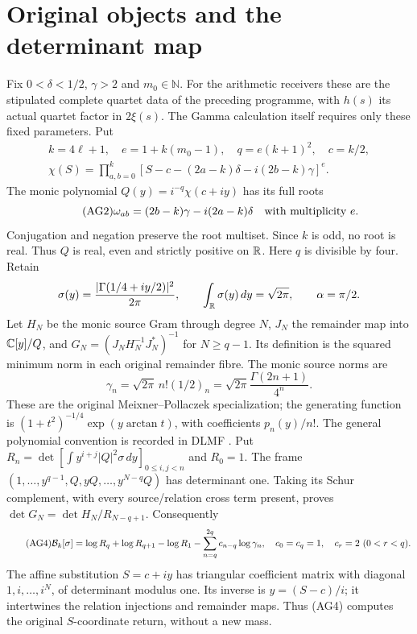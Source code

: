 \documentclass[11pt,a4paper]{article}
\providecommand{\dd}{\,d}
\begin{document}
\section{Original objects and the determinant map}
Fix $0<\delta<1/2$, $\gamma>2$ and $m_0\in\mathbb N$. For the arithmetic
receivers these are the stipulated complete quartet data of the preceding
programme, with $h(s)$ its actual quartet factor in $2\xi(s)$.
The Gamma calculation itself requires only these fixed parameters. Put
\begin{equation}\tag{AG1}
\begin{gathered}
 k=4\ell+1,\quad e=1+k(m_0-1),\quad q=e(k+1)^2,\quad c=k/2,\\
 \chi(S)=\prod_{a,b=0}^k
 [S-c-(2a-k)\delta-i(2b-k)\gamma]^e.
\end{gathered}
\end{equation}
The monic polynomial $Q(y)=i^{-q}\chi(c+iy)$ has its full roots
\begin{equation}\tag{AG2}
 \omega_{ab}=(2b-k)\gamma-i(2a-k)\delta
 \quad\hbox{with multiplicity }e.
\end{equation}
Conjugation and negation preserve the root multiset. Since $k$ is odd,
no root is real. Thus $Q$ is real, even and strictly positive on $\mathbb R$.
Here $q$ is divisible by four. Retain
\[
 \sigma(y)=\frac{|\Gamma(1/4+iy/2)|^2}{2\pi},\qquad
 \int_\R\sigma(y)\dd y=\sqrt{2\pi},\qquad \alpha=\pi/2.
\]
Let $H_N$ be the monic source Gram through degree $N$, $J_N$ the remainder
map into $\mathbb C[y]/Q$, and $G_N=(J_NH_N^{-1}J_N^*)^{-1}$ for $N\ge q-1$.
Its definition is the squared minimum norm in each original remainder fibre.
The monic source norms are
\begin{equation}\tag{AG3}
 \gamma_n=\sqrt{2\pi}\,n!(1/2)_n
 =\sqrt{2\pi}\frac{\Gamma(2n+1)}{4^n}.
\end{equation}
These are the original Meixner--Pollaczek specialization; the generating
function is $(1+t^2)^{-1/4}\exp(y\arctan t)$, with coefficients $p_n(y)/n!$.
The general polynomial convention is recorded in DLMF \cite{a03ag:DLMF}.
Put $R_n=\det[\int y^{i+j}|Q|^2\sigma\dd y]_{0\le i,j<n}$ and $R_0=1$.
The frame $(1,\ldots,y^{q-1},Q,yQ,\ldots,y^{N-q}Q)$ has determinant one.
Taking its Schur complement, with every source/relation cross term present,
proves $\det G_N=\det H_N/R_{N-q+1}$. Consequently
\begin{equation}\tag{AG4}
 \mathcal B_k[\sigma]=\log R_q+\log R_{q+1}-\log R_1
       -\sum_{n=q}^{2q}c_{n-q}\log\gamma_n,
 \quad c_0=c_q=1,\quad c_r=2\ (0<r<q).
\end{equation}
The affine substitution $S=c+iy$ has triangular coefficient matrix with
diagonal $1,i,\ldots,i^N$, of determinant modulus one. Its inverse is
$y=(S-c)/i$; it intertwines the relation injections and remainder maps.
Thus (AG4) computes the original $S$-coordinate return, without a new mass.
\end{document}
